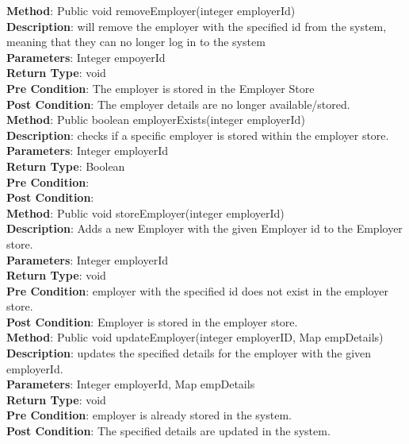 \documentclass{l3deliverable}
\begin{document}
\textbf{Method}: Public void removeEmployer(integer employerId) \\
\textbf{Description}: will remove the employer with the specified id from the system, meaning that they can no longer log in to the system\\
\textbf{Parameters}: Integer empoyerId\\
\textbf{Return Type}: void\\
\textbf{Pre Condition}: The employer is stored in the Employer Store\\
\textbf{Post Condition}: The employer details are no longer available/stored.\\

\textbf{Method}: Public boolean employerExists(integer employerId) \\
\textbf{Description}: checks if a specific employer is stored within the employer store.\\
\textbf{Parameters}: Integer employerId\\
\textbf{Return Type}: Boolean\\
\textbf{Pre Condition}:\\
\textbf{Post Condition}:\\

\textbf{Method}: Public void storeEmployer(integer employerId) \\
\textbf{Description}:  Adds a new Employer with the given Employer id to the Employer store.\\
\textbf{Parameters}: Integer employerId\\
\textbf{Return Type}: void\\
\textbf{Pre Condition}: employer with the specified id does not exist in the employer store.\\
\textbf{Post Condition}: Employer is stored in the employer store.\\

\textbf{Method}: Public void updateEmployer(integer employerID, Map empDetails)\\
\textbf{Description}: updates the specified details for the employer with the given employerId.\\
\textbf{Parameters}: Integer employerId, Map empDetails\\
\textbf{Return Type}: void\\
\textbf{Pre Condition}: employer is already stored in the system.\\
\textbf{Post Condition}: The specified details are updated in the system.\\
\end{document}
